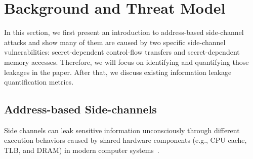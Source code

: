 \section{Background and Threat Model}
In this section, we first present an introduction to address-based side-channel
attacks and show many of them are caused by two specific side-channel
vulnerabilities: secret-dependent control-flow transfers and secret-dependent
memory accesses. Therefore, we will focus on identifying and quantifying those
leakages in the paper. After that, we discuss existing information leakage quantification 
metrics.

\subsection{Address-based Side-channels}
Side channels can leak sensitive information
unconsciously through different execution behaviors caused by shared 
hardware components (e.g., CPU cache, TLB, and
DRAM) in modern computer systems~\cite{ge2018survey,szefer2019survey,191010,184415,Osvik2006,liu2015last,184415}. 


